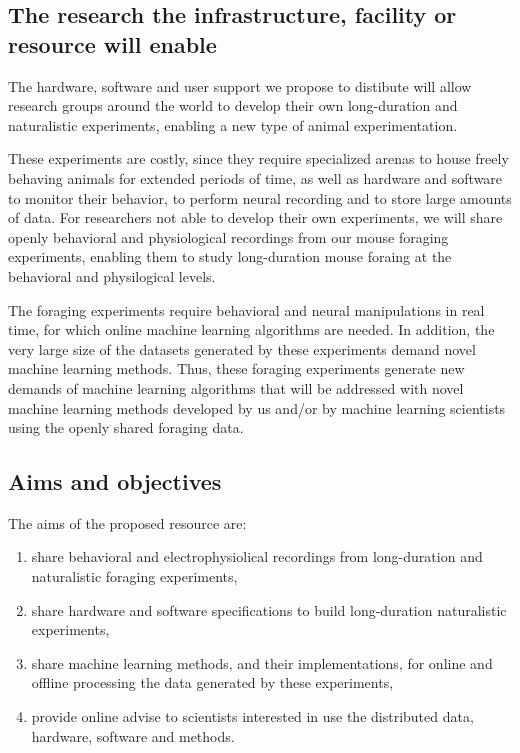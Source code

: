 \subsection{The research the infrastructure, facility or resource will enable}

The hardware, software and user support we propose to distibute will allow
research groups around the world to develop their own long-duration and
naturalistic experiments, enabling a new type of animal experimentation.

These experiments are costly, since they require specialized arenas to house
freely behaving animals for extended periods of time, as well as hardware and
software to monitor their behavior, to perform neural recording and to store
large amounts of data. For researchers not able to develop their own
experiments, we will share openly behavioral and physiological recordings
from our mouse foraging experiments, enabling them to study long-duration mouse
foraing at the behavioral and physilogical levels.

The foraging experiments require behavioral and neural manipulations in real
time, for which online machine learning algorithms are needed. In addition, the
very large size of the datasets generated by these experiments demand novel
machine learning methods. Thus, these foraging experiments generate new demands
of machine learning algorithms that will be addressed with novel machine
learning methods developed by us and/or by machine learning scientists using
the openly shared foraging data.

\subsection{Aims and objectives}

The aims of the proposed resource are:

\begin{enumerate}

    \item share behavioral and electrophysiolical recordings from long-duration
        and naturalistic foraging experiments,

    \item share hardware and software specifications to build long-duration
        naturalistic experiments,

    \item share machine learning methods, and their implementations, for online
        and offline processing the data generated by these experiments,

    \item provide online advise to scientists interested in use the distributed
        data, hardware, software and methods.

\end{enumerate}

